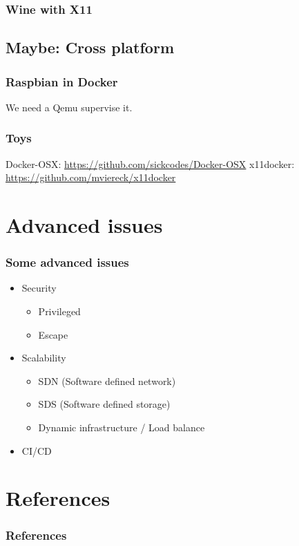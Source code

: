 \documentclass{beamer}
\begin{document}
\begin{frame}
    \frametitle{Wine with X11}
    
\end{frame}

\subsection{Maybe: Cross platform}
\begin{frame}
    \frametitle{Raspbian in Docker}
    \centering We need a Qemu supervise it.
    
\end{frame}

\begin{frame}
    \frametitle{Toys}
    Docker-OSX: \url{https://github.com/sickcodes/Docker-OSX}
    \newline
    x11docker: \url{https://github.com/mviereck/x11docker}
\end{frame}

\section{Advanced issues}
\begin{frame}
    \frametitle{Some advanced issues}
    \begin{itemize}
        \item Security
              \begin{itemize}
                  \item Privileged
                  \item Escape
              \end{itemize}
        \item Scalability
              \begin{itemize}
                  \item SDN (Software defined network)
                  \item SDS (Software defined storage)
                  \item Dynamic infrastructure / Load balance
              \end{itemize}
        \item CI/CD
    \end{itemize}
\end{frame}


\section{References}
\begin{frame}[t, allowframebreaks]
    \frametitle{References}
    \renewcommand*{\bibfont}{\scriptsize}
    \printbibliography
\end{frame}
\end{document}
